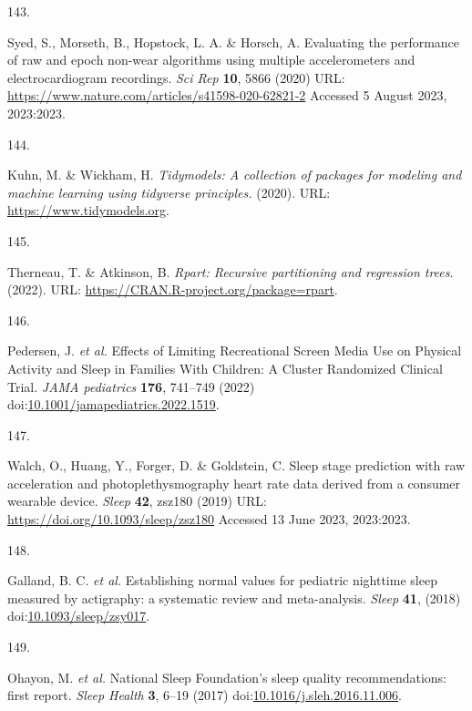 \documentclass[
  10pt,
]{scrbook}
\newlength{\cslhangindent}
\newlength{\csllabelwidth}
\newlength{\cslentryspacingunit} %
\newenvironment{CSLReferences}[2] %
 {%
  \setlength{\parindent}{0pt}
  \ifodd #1
  \let\oldpar\par
  \def\par{\hangindent=\cslhangindent\oldpar}
  \fi
  \setlength{\parskip}{#2\cslentryspacingunit}
 }%
 {}
\newcommand{\CSLLeftMargin}[1]{\parbox[t]{\csllabelwidth}{#1}}
\newcommand{\CSLRightInline}[1]{\parbox[t]{\linewidth - \csllabelwidth}{#1}\break}
\let\originaltextbf\textbf
\renewcommand{\textbf}[1]{\textcolor{color1}{\textsf{\originaltextbf{#1}}}}
\begin{document}
\begin{CSLReferences}{0}{0}
\leavevmode{}%
\CSLLeftMargin{143. }%
\CSLRightInline{Syed, S., Morseth, B., Hopstock, L. A. \& Horsch, A.
Evaluating the performance of raw and epoch non-wear algorithms using
multiple accelerometers and electrocardiogram recordings. \emph{Sci Rep}
\textbf{10}, 5866 (2020) URL:
\url{https://www.nature.com/articles/s41598-020-62821-2} Accessed 5
August 2023, 2023:2023.}

\leavevmode{}%
\CSLLeftMargin{144. }%
\CSLRightInline{Kuhn, M. \& Wickham, H. \emph{Tidymodels: A collection
of packages for modeling and machine learning using tidyverse
principles.} (2020). URL: \url{https://www.tidymodels.org}.}

\leavevmode{}%
\CSLLeftMargin{145. }%
\CSLRightInline{Therneau, T. \& Atkinson, B. \emph{Rpart: Recursive
partitioning and regression trees}. (2022). URL:
\url{https://CRAN.R-project.org/package=rpart}.}

\leavevmode{}%
\CSLLeftMargin{146. }%
\CSLRightInline{Pedersen, J. \emph{et al.} Effects of Limiting
Recreational Screen Media Use on Physical Activity and Sleep in Families
With Children: A Cluster Randomized Clinical Trial. \emph{JAMA
pediatrics} \textbf{176}, 741--749 (2022)
doi:\href{https://doi.org/10.1001/jamapediatrics.2022.1519}{10.1001/jamapediatrics.2022.1519}.}

\leavevmode{}%
\CSLLeftMargin{147. }%
\CSLRightInline{Walch, O., Huang, Y., Forger, D. \& Goldstein, C. Sleep
stage prediction with raw acceleration and photoplethysmography heart
rate data derived from a consumer wearable device. \emph{Sleep}
\textbf{42}, zsz180 (2019) URL:
\url{https://doi.org/10.1093/sleep/zsz180} Accessed 13 June 2023,
2023:2023.}

\leavevmode{}%
\CSLLeftMargin{148. }%
\CSLRightInline{Galland, B. C. \emph{et al.} Establishing normal values
for pediatric nighttime sleep measured by actigraphy: a systematic
review and meta-analysis. \emph{Sleep} \textbf{41}, (2018)
doi:\href{https://doi.org/10.1093/sleep/zsy017}{10.1093/sleep/zsy017}.}

\leavevmode{}%
\CSLLeftMargin{149. }%
\CSLRightInline{Ohayon, M. \emph{et al.} National Sleep Foundation's
sleep quality recommendations: first report. \emph{Sleep Health}
\textbf{3}, 6--19 (2017)
doi:\href{https://doi.org/10.1016/j.sleh.2016.11.006}{10.1016/j.sleh.2016.11.006}.}


\end{CSLReferences}
\end{document}
